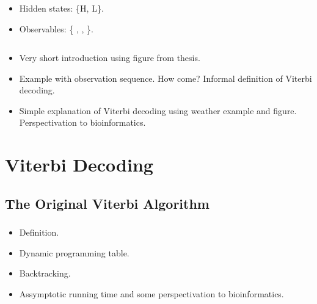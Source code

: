 \documentclass[english]{beamer}
\begin{document}
\begin{frame}
  \frametitle{\insertsection}
  \begin{columns}
    \begin{column}{0.3\textwidth}
      \begin{itemize}
      \item Hidden states: \{H, L\}.
      \item Observables: \{ \Sun, \Cloud, \Rain\}.
      \end{itemize}
    \end{column}%
    \begin{column}{0.7\textwidth}
      \begin{figure}
        \centering \framebox{}
      \end{figure}
    \end{column}
  \end{columns}
  \begin{itemize}
    \tiny
  \item Very short introduction using figure from thesis.
  \item Example with observation sequence. How come? Informal definition of
    Viterbi decoding.
  \item Simple explanation of Viterbi decoding using weather example and figure.
    Perspectivation to bioinformatics.
  \end{itemize}
\end{frame}

\section{Viterbi Decoding}

\subsection{The Original Viterbi Algorithm}

\begin{frame}
  \frametitle{\insertsubsection}
  \begin{itemize}
    \tiny
  \item Definition.
  \item Dynamic programming table.
  \item Backtracking.
  \item Assymptotic running time and some perspectivation to bioinformatics.
  \end{itemize}
\end{frame}
\end{document}
